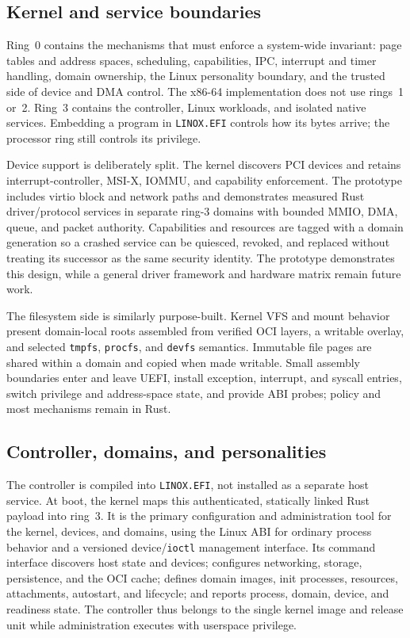 \documentclass[11pt]{article}
\begin{document}
\subsection{Kernel and service boundaries}

Ring~0 contains the mechanisms that must enforce a system-wide invariant:
page tables and address spaces, scheduling, capabilities, IPC, interrupt and
timer handling, domain ownership, the Linux personality boundary, and the
trusted side of device and DMA control. The x86-64 implementation does not use
rings~1 or~2. Ring~3 contains the controller, Linux workloads, and isolated
native services. Embedding a program in \texttt{LINOX.EFI} controls how its
bytes arrive; the processor ring still controls its privilege.

Device support is deliberately split. The kernel discovers PCI devices and
retains interrupt-controller, MSI-X, IOMMU, and capability enforcement. The
prototype includes virtio block and network paths and demonstrates measured
Rust driver/protocol services in separate ring-3 domains with bounded MMIO,
DMA, queue, and packet authority. Capabilities and resources are tagged with a
domain generation so a crashed service can be quiesced, revoked, and replaced
without treating its successor as the same security identity. The prototype
demonstrates this design, while a general driver framework and hardware matrix
remain future work.

The filesystem side is similarly purpose-built. Kernel VFS and mount behavior
present domain-local roots assembled from verified OCI layers, a writable
overlay, and selected \texttt{tmpfs}, \texttt{procfs}, and \texttt{devfs}
semantics. Immutable file pages are shared within a domain and copied when made
writable. Small assembly boundaries enter and leave UEFI, install exception,
interrupt, and syscall entries, switch privilege and address-space state, and
provide ABI probes; policy and most mechanisms remain in Rust.

\subsection{Controller, domains, and personalities}

The controller is compiled into \texttt{LINOX.EFI}, not installed as a separate
host service. At boot, the kernel maps this authenticated, statically linked
Rust payload into ring~3. It is the primary configuration and administration
tool for the kernel, devices, and domains, using the Linux ABI for ordinary
process behavior and a versioned device/\texttt{ioctl} management interface.
Its command interface discovers host state and devices; configures networking,
storage, persistence, and the OCI cache; defines domain images, init processes,
resources, attachments, autostart, and lifecycle; and reports process, domain,
device, and readiness state. The controller thus belongs to the single kernel
image and release unit while administration executes with userspace privilege.
\end{document}

